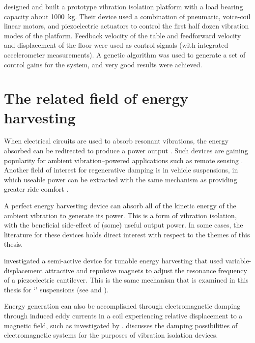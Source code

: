 \textcite{yoshioka2001} designed and built a prototype vibration
isolation platform with a load bearing capacity about
\SI{1000}{kg}. Their device used a combination of pneumatic,
voice-coil linear motors, and piezoelectric actuators to control the
first half dozen vibration modes of the platform. Feedback velocity of
the table and feedforward velocity and displacement of the floor were
used as control signals (with integrated accelerometer
measurements). A genetic algorithm was used to generate a set of
control gains for the system, and very good results were achieved.



\section{The related field of energy harvesting}

When electrical circuits are used to absorb resonant vibrations, the energy
absorbed can be redirected to produce a power output \cite{stephen2006}. Such
devices are gaining popularity for ambient vibration--powered applications
such as remote sensing \cite{arnold2007}. Another field of interest for
regenerative damping is in vehicle suspensions, in which useable power can be
extracted with the same mechanism as providing greater ride comfort
\cite{graves2000thesis}.

A perfect energy harvesting device can absorb all of the kinetic energy of the
ambient vibration to generate its power. This is a form of vibration
isolation, with the beneficial side-effect of (some) useful output power. In
some cases, the literature for these devices holds direct interest with
respect to the themes of this thesis.

\textcite{challa2008} investigated a semi-active device for tunable energy
harvesting that used variable-displacement attractive and repulsive magnets to
adjust the resonance frequency of a piezoelectric cantilever. This is the same
mechanism that is examined in this thesis for `\qzs' suspensions (see
 and ).

Energy generation can also be accomplished through electromagnetic damping
through induced eddy currents in a coil experiencing relative displacement to
a magnetic field, such as investigated by \textcite{graves2000}.
 discusses the damping possibilities of electromagnetic
systems for the purposes of vibration isolation devices.


